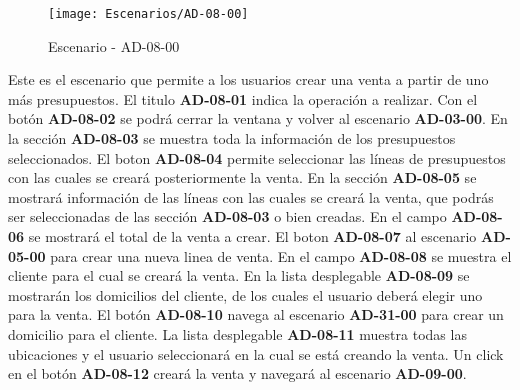 \begin{figure}[H]
\centering
\texttt{[image: Escenarios/AD-08-00]}
\caption{Escenario - AD-08-00}
\label{fig:AD-08-00}
\end{figure}
Este es el escenario que permite a los usuarios crear una venta a partir de uno más presupuestos. El titulo \textbf{AD-08-01} indica la operación a realizar. Con el botón \textbf{AD-08-02} se podrá cerrar la ventana y volver al escenario \textbf{AD-03-00}.
En la sección \textbf{AD-08-03} se muestra toda la información de los presupuestos seleccionados. El boton \textbf{AD-08-04} permite seleccionar las líneas de presupuestos con las cuales se creará posteriormente la venta. En la sección \textbf{AD-08-05} se mostrará información de las líneas con las cuales se creará la venta, que podrás ser seleccionadas de las sección \textbf{AD-08-03} o bien creadas. En el campo \textbf{AD-08-06} se mostrará el total de la venta a crear. El boton \textbf{AD-08-07} al escenario \textbf{AD-05-00} para crear una nueva linea de venta.
En el campo \textbf{AD-08-08} se muestra el cliente para el cual se creará la venta. En la lista desplegable \textbf{AD-08-09} se mostrarán los domicilios del cliente, de los cuales el usuario deberá elegir uno para la venta. El botón \textbf{AD-08-10} navega al escenario \textbf{AD-31-00} para crear un domicilio para el cliente. La lista desplegable \textbf{AD-08-11} muestra todas las ubicaciones y el usuario seleccionará en la cual se está creando la venta. Un click en el botón \textbf{AD-08-12} creará la venta y navegará al escenario \textbf{AD-09-00}.
\clearpage
